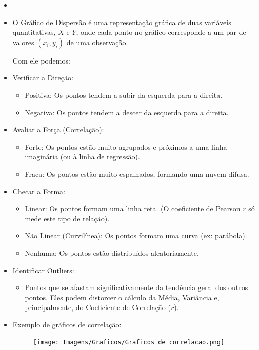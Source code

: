 \documentclass[a4paper,11pt]{article}
\begin{document}
\begin{itemize}
\item[]

    \item O Gráfico de Dispersão é uma representação gráfica de duas variáveis quantitativas, $X$ e $Y$, onde cada ponto no gráfico corresponde a um par de valores $(x_i, y_i)$ de uma observação.

    Com ele podemos:
    \item Verificar a Direção:
    \begin{itemize}
        \item Positiva: Os pontos tendem a subir da esquerda para a direita.
        \item Negativa: Os pontos tendem a descer da esquerda para a direita.
    \end{itemize}
    
    \item Avaliar a Força (Correlação):
    \begin{itemize}
        \item Forte: Os pontos estão muito agrupados e próximos a uma linha imaginária (ou à linha de regressão).
        \item Fraca: Os pontos estão muito espalhados, formando uma nuvem difusa.
    \end{itemize}
    
    \item Checar a Forma:
    \begin{itemize}
        \item Linear: Os pontos formam uma linha reta. (O coeficiente de Pearson $r$ só mede este tipo de relação).
        \item Não Linear (Curvilínea): Os pontos formam uma curva (ex: parábola).
        \item Nenhuma: Os pontos estão distribuídos aleatoriamente.
    \end{itemize}    
    
    \item Identificar Outliers:
    \begin{itemize}
        \item Pontos que se afastam significativamente da tendência geral dos outros pontos. Eles podem distorcer o cálculo da Média, Variância e, principalmente, do Coeficiente de Correlação ($r$).
    \end{itemize}

    \item Exemplo de gráficos de correlação:

    \begin{figure}[H] 
    \centering 
    \texttt{[image: Imagens/Graficos/Graficos de correlacao.png]} 
\end{figure}

    
\end{itemize}
\end{document}
